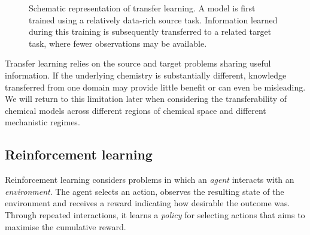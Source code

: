 \begin{figure}[htbp]
{%
  }

  \caption{
    Schematic representation of transfer learning.
    A model is first trained using a relatively data-rich source task.
    Information learned during this training is subsequently transferred to a related target task, where fewer observations may be available.
  }
  \label{fig2-12:transfer-learning}
\end{figure}

Transfer learning relies on the source and target problems sharing useful information.
If the underlying chemistry is substantially different, knowledge transferred from one domain may provide little benefit or can even be misleading.
We will return to this limitation later when considering the transferability of chemical models across different regions of chemical space and different mechanistic regimes.

\subsection{Reinforcement learning}

Reinforcement learning considers problems in which an \textit{agent} interacts with an \textit{environment}.
The agent selects an action, observes the resulting state of the environment and receives a reward indicating how desirable the outcome was.
Through repeated interactions, it learns a \textit{policy} for selecting actions that aims to maximise the cumulative reward.

